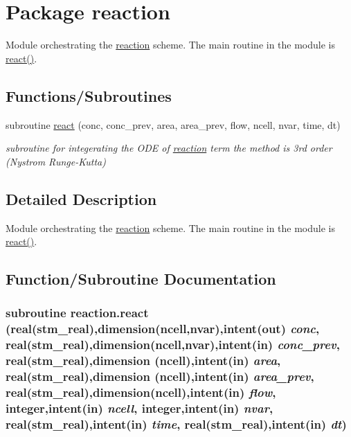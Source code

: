\hypertarget{a00068}{
\section{Package reaction}
\label{a00068}
}
Module orchestrating the \hyperlink{a00068}{reaction} scheme. The main routine in the module is \hyperlink{a00068_ce059846828705ce745ad6a3549d3d8a}{react()}.  


\subsection*{Functions/Subroutines}
\begin{CompactItemize}
\item 
subroutine \hyperlink{a00068_ce059846828705ce745ad6a3549d3d8a}{react} (conc, conc\_\-prev, area, area\_\-prev, flow, ncell, nvar, time, dt)
\begin{CompactList}\small\item\em subroutine for integerating the ODE of \hyperlink{a00068}{reaction} term the method is 3rd order (Nystrom Runge-Kutta) \item\end{CompactList}\end{CompactItemize}


\subsection{Detailed Description}
Module orchestrating the \hyperlink{a00068}{reaction} scheme. The main routine in the module is \hyperlink{a00068_ce059846828705ce745ad6a3549d3d8a}{react()}. 



\subsection{Function/Subroutine Documentation}
\hypertarget{a00068_ce059846828705ce745ad6a3549d3d8a}{
\subsubsection[{react}]{\setlength{\rightskip}{0pt plus 5cm}subroutine reaction.react (real(stm\_\-real),dimension(ncell,nvar),intent(out) {\em conc}, \/  real(stm\_\-real),dimension(ncell,nvar),intent(in) {\em conc\_\-prev}, \/  real(stm\_\-real),dimension (ncell),intent(in) {\em area}, \/  real(stm\_\-real),dimension (ncell),intent(in) {\em area\_\-prev}, \/  real(stm\_\-real),dimension(ncell),intent(in) {\em flow}, \/  integer,intent(in) {\em ncell}, \/  integer,intent(in) {\em nvar}, \/  real(stm\_\-real),intent(in) {\em time}, \/  real(stm\_\-real),intent(in) {\em dt})}}
\label{a00068_ce059846828705ce745ad6a3549d3d8a}



